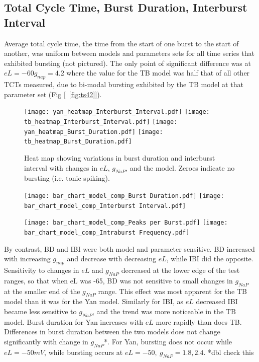 \documentclass[11pt]{article}
\begin{document}
\subsection{Total Cycle Time, Burst Duration, Interburst Interval}


Average total cycle time, the time from the start of one burst to the start of another, was uniform between models and parameters sets for all time series that exhibited bursting (not pictured). The only point of significant difference was at $eL=-60 g_{nap} = 4.2$ where the value for the TB model was half that of all other TCTs measured, due to bi-modal bursting exhibited by the TB model at that parameter set (Fig [~\ref{fig:ts42}]). 


\begin{figure}[h]
	\centering
	\texttt{[image: yan\_heatmap\_Interburst\_Interval.pdf]}
	\texttt{[image: tb\_heatmap\_Interburst\_Interval.pdf]}
	\texttt{[image: yan\_heatmap\_Burst\_Duration.pdf]}
	\texttt{[image: tb\_heatmap\_Burst\_Duration.pdf]}
	\caption{Heat map showing variations in burst duration and interburst interval with changes in $eL$, $g_{NaP}$, and the model. Zeroes indicate no bursting (i.e. tonic spiking).}
	\label{fig:hm_bd_ibi}
\end{figure}

\begin{figure}[h]
\texttt{[image: bar\_chart\_model\_comp\_Burst Duration.pdf]}
\texttt{[image: bar\_chart\_model\_comp\_Interburst Interval.pdf]}
\end{figure}

\begin{figure}[h]
\texttt{[image: bar\_chart\_model\_comp\_Peaks per Burst.pdf]}
\texttt{[image: bar\_chart\_model\_comp\_Intraburst Frequency.pdf]}
\end{figure}

By contrast, BD and IBI were both model and parameter sensitive. BD increased with increasing $g_{nap}$ and decrease with decreasing $eL$, while IBI did the opposite. Sensitivity to changes in $eL$ and $g_{NaP}$ decreased at the lower edge of the test ranges, so that when eL was -65, BD was not sensitive to small changes in $g_{NaP}$ at the smaller end of the $g_{NaP}$ range. This effect was most apparent for the TB model than it was for the Yan model. Similarly for IBI,  as $eL$ decreased IBI became less sensitive to $g_{NaP}$, and the trend was more noticeable in the TB model. Burst duration for Yan increases with $eL$ more rapidly than does TB. Differences in burst duration between the two models does not change significantly with change in $g_{NaP}$*. For Yan, bursting does not occur while $eL = -50 mV$, while bursting occurs at $eL=-50,\  g_{NaP}=1.8, 2.4$. 
*dbl check this
\end{document}
